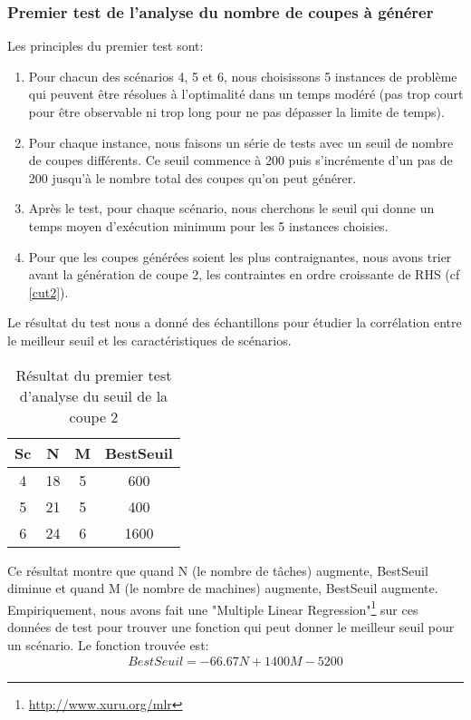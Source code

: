 \documentclass[twoside,fleqn]{EPURapport}
\begin{document}
\subsubsection{Premier test de l'analyse du nombre de coupes à générer}
Les principles du premier test sont:
\begin{enumerate}
	\item Pour chacun des scénarios 4, 5 et 6, nous choisissons 5 instances de problème qui peuvent être résolues à l'optimalité dans un temps modéré (pas trop court pour être observable ni trop long pour ne pas dépasser la limite de temps).
	\item Pour chaque instance, nous faisons un série de tests avec un seuil de nombre de coupes différents. Ce seuil commence à 200 puis s'incrémente d'un pas de 200 jusqu'à le nombre total des coupes qu'on peut générer.
	\item Après le test, pour chaque scénario, nous cherchons le seuil qui donne un temps moyen d'exécution minimum pour les 5 instances choisies.
	\item Pour que les coupes générées soient les plus contraignantes, nous avons trier avant la génération de coupe 2, les contraintes en ordre croissante de RHS (cf \ref{cut2}).
\end{enumerate}
	
Le résultat du test nous a donné des échantillons pour étudier la corrélation entre le meilleur seuil et les caractéristiques de scénarios.

\begin{table}[h]
    \centering
    \begin{tabular}{|c|c|c|c|}
    	\hline
Sc& 	N	& M	& BestSeuil\\ \hline
4 & 	18	& 5	& 600      \\ \hline
5 & 	21	& 5	& 400      \\ \hline
6 & 	24	& 6	& 1600     \\ \hline
    \end{tabular}
    \caption{Résultat du premier test d'analyse du seuil de la coupe 2}
    \label{tab_pre_2_seuil}
\end{table}
\bigskip

Ce résultat montre que quand N (le nombre de tâches) augmente, BestSeuil diminue et quand M (le nombre de machines) augmente, BestSeuil augmente. Empiriquement, nous avons fait une "Multiple Linear Regression"\footnote{\url{http://www.xuru.org/mlr}} sur ces données de test pour trouver une fonction qui peut donner le meilleur seuil pour un scénario. Le fonction trouvée est:
\begin{align}
BestSeuil=-66.67N+1400M-5200 
\end{align}
\end{document}
